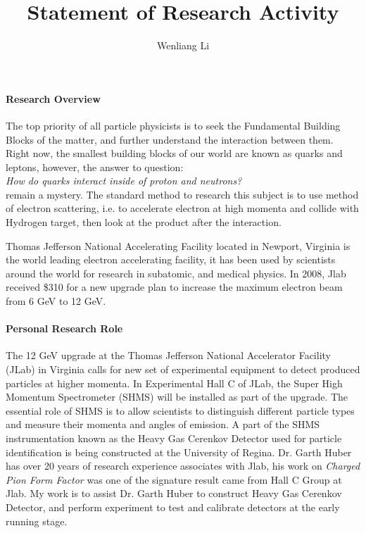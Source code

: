 \documentclass[12pt, letterpaper]{article}
\title{Statement of Research Activity}
\author{Wenliang Li}
\begin{document}
\maketitle
\onehalfspacing

\paragraph{Research Overview}
The top priority of all particle physicists is to seek the Fundamental Building Blocks of the matter, and further understand the interaction between them. Right now, the smallest building blocks of our world are known as quarks and leptons, however, the answer to question:\\ 
\emph{How do quarks interact inside of proton and neutrons?} \\
remain a mystery. The standard method to research this subject is to use method of electron scattering, i.e. to accelerate electron at high momenta and collide with Hydrogen target, then look at the product after the interaction.

Thomas Jefferson National Accelerating Facility located in Newport, Virginia is the world leading electron accelerating facility, it has been used by scientists around the world for research in subatomic, and medical physics. In 2008, Jlab received \$310 for a new upgrade plan to increase the maximum electron beam from 6 GeV to 12 GeV.  


\paragraph{Personal Research Role}
The 12 GeV upgrade at the Thomas Jefferson National Accelerator Facility (JLab) in Virginia calls for new set of experimental equipment to detect produced particles at higher momenta.  In Experimental Hall C of JLab, the Super High Momentum Spectrometer (SHMS) will be installed as part of the upgrade.  The essential role of SHMS is to allow scientists to distinguish different particle types and measure their momenta and angles of emission. A part of the SHMS instrumentation known as the Heavy Gas Cerenkov Detector used for particle identification is being constructed at the University of Regina. 
Dr. Garth Huber has over 20 years of research experience associates with Jlab, his work on \emph{Charged Pion Form Factor} was one of the signature result came from Hall C Group at Jlab. My work is to assist Dr. Garth Huber to construct Heavy Gas Cerenkov Detector, and perform experiment to test and calibrate detectors at the early running stage.
\end{document}
